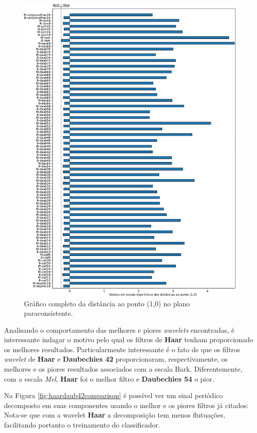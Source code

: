 	\begin{figure}[h]
		\centering
		\includegraphics[width=0.91\linewidth]{images/results/paraconsistentPlane/ParaconsistentFull.pdf}
		\caption{Gráfico completo da distância ao ponto (1,0) no plano paraconsistente.}
		\label{fig:paraconsistentfull}
	\end{figure}

	\par Analisando o comportamento das melhores e piores \textit{wavelets} encontradas, é interessante indagar o motivo pelo qual os filtros de \textbf{Haar} tenham proporcionado os melhores resultados. Particularmente interessante é o fato de que os filtros \textit{wavelet} de \textbf{Haar} e \textbf{Daubechies 42} proporcionaram, respectivamente, os melhores e os piores resultados associados com a escala Bark. Diferentemente, com a escala \textit{Mel}, \textbf{Haar} foi o melhor filtro e \textbf{Daubechies 54} o pior. \\
	
	\par Na Figura \ref{fig:haardaub42comparison} é possível ver um sinal periódico decomposto em suas componentes usando o melhor e os piores filtros já citados: Nota-se que com a wavelet \textbf{Haar} a decomposição tem menos flutuações, facilitando portanto o treinamento do classificador.

